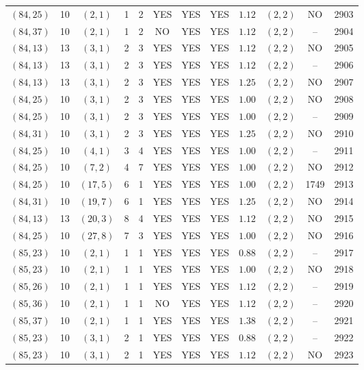 \begin{longtable}{|c|c|c|c|c|c|c|c|c|c|c|c|}
$(84,25)$ & 10 & $(2,1)$ & 1 & 2 & YES & YES & YES & $1.12$ & $(2,2)$ & NO & 2903\\
$(84,37)$ & 10 & $(2,1)$ & 1 & 2 & NO & YES & YES & $1.12$ & $(2,2)$ & -- & 2904\\
$(84,13)$ & 13 & $(3,1)$ & 2 & 3 & YES & YES & YES & $1.12$ & $(2,2)$ & NO & 2905\\
$(84,13)$ & 13 & $(3,1)$ & 2 & 3 & YES & YES & YES & $1.12$ & $(2,2)$ & -- & 2906\\
$(84,13)$ & 13 & $(3,1)$ & 2 & 3 & YES & YES & YES & $1.25$ & $(2,2)$ & NO & 2907\\
$(84,25)$ & 10 & $(3,1)$ & 2 & 3 & YES & YES & YES & $1.00$ & $(2,2)$ & NO & 2908\\
$(84,25)$ & 10 & $(3,1)$ & 2 & 3 & YES & YES & YES & $1.00$ & $(2,2)$ & -- & 2909\\
$(84,31)$ & 10 & $(3,1)$ & 2 & 3 & YES & YES & YES & $1.25$ & $(2,2)$ & NO & 2910\\
$(84,25)$ & 10 & $(4,1)$ & 3 & 4 & YES & YES & YES & $1.00$ & $(2,2)$ & -- & 2911\\
$(84,25)$ & 10 & $(7,2)$ & 4 & 7 & YES & YES & YES & $1.00$ & $(2,2)$ & NO & 2912\\
$(84,25)$ & 10 & $(17,5)$ & 6 & 1 & YES & YES & YES & $1.00$ & $(2,2)$ & 1749 & 2913\\
$(84,31)$ & 10 & $(19,7)$ & 6 & 1 & YES & YES & YES & $1.25$ & $(2,2)$ & NO & 2914\\
$(84,13)$ & 13 & $(20,3)$ & 8 & 4 & YES & YES & YES & $1.12$ & $(2,2)$ & NO & 2915\\
$(84,25)$ & 10 & $(27,8)$ & 7 & 3 & YES & YES & YES & $1.00$ & $(2,2)$ & NO & 2916\\
$(85,23)$ & 10 & $(2,1)$ & 1 & 1 & YES & YES & YES & $0.88$ & $(2,2)$ & -- & 2917\\
$(85,23)$ & 10 & $(2,1)$ & 1 & 1 & YES & YES & YES & $1.00$ & $(2,2)$ & NO & 2918\\
$(85,26)$ & 10 & $(2,1)$ & 1 & 1 & YES & YES & YES & $1.12$ & $(2,2)$ & -- & 2919\\
$(85,36)$ & 10 & $(2,1)$ & 1 & 1 & NO & YES & YES & $1.12$ & $(2,2)$ & -- & 2920\\
$(85,37)$ & 10 & $(2,1)$ & 1 & 1 & YES & YES & YES & $1.38$ & $(2,2)$ & -- & 2921\\
$(85,23)$ & 10 & $(3,1)$ & 2 & 1 & YES & YES & YES & $0.88$ & $(2,2)$ & -- & 2922\\
$(85,23)$ & 10 & $(3,1)$ & 2 & 1 & YES & YES & YES & $1.12$ & $(2,2)$ & NO & 2923\\

\end{longtable}
